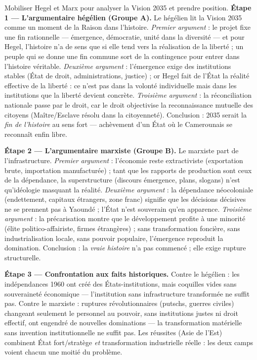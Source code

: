 \documentclass[11pt]{article}
\newcommand{\cle}[1]{{\popxbold\color{popdark}#1}}
\begin{document}
\begin{exoresolu}
Mobiliser Hegel et Marx pour analyser la Vision 2035 et prendre position.
\tcblower
\textbf{Étape 1 — L'argumentaire hégélien (Groupe A).} Le hégélien lit la Vision 2035 comme un moment de la Raison dans l'histoire. \emph{Premier argument} : le projet fixe une \cle{fin rationnelle} — émergence, démocratie, unité dans la diversité — et pour Hegel, l'histoire n'a de sens que si elle tend vers la réalisation de la liberté ; un peuple qui se donne une fin commune sort de la contingence pour entrer dans l'histoire véritable. \emph{Deuxième argument} : l'émergence exige des \cle{institutions stables} (État de droit, administrations, justice) ; or Hegel fait de l'État la réalité effective de la liberté : ce n'est pas dans la volonté individuelle mais dans les institutions que la liberté devient concrète. \emph{Troisième argument} : la \cle{réconciliation nationale} passe par le droit, car le droit objectivise la reconnaissance mutuelle des citoyens (Maître/Esclave résolu dans la citoyenneté). Conclusion : 2035 serait la \emph{fin de l'histoire} au sens fort — achèvement d'un État où le Camerounais se reconnaît enfin libre.

\textbf{Étape 2 — L'argumentaire marxiste (Groupe B).} Le marxiste part de l'\cle{infrastructure}. \emph{Premier argument} : l'économie reste \cle{extractiviste} (exportation brute, importation manufacturée) ; tant que les rapports de production sont ceux de la dépendance, la superstructure (discours émergence, plans, slogans) n'est qu'\cle{idéologie} masquant la réalité. \emph{Deuxième argument} : la \cle{dépendance néocoloniale} (endettement, capitaux étrangers, zone franc) signifie que les décisions décisives ne se prennent pas à Yaoundé ; l'État n'est souverain qu'en apparence. \emph{Troisième argument} : la \cle{précarisation} montre que le développement profite à une minorité (élite politico-affairiste, firmes étrangères) ; sans transformation foncière, sans industrialisation locale, sans pouvoir populaire, l'émergence reproduit la domination. Conclusion : la \emph{vraie histoire} n'a pas commencé ; elle exige rupture structurelle.

\textbf{Étape 3 — Confrontation aux faits historiques.} Contre le hégélien : les indépendances 1960 ont créé des États-institutions, mais coquilles vides sans souveraineté économique — l'institution sans infrastructure transformée ne suffit pas. Contre le marxiste : ruptures révolutionnaires (putschs, guerres civiles) changeant seulement le personnel au pouvoir, sans institutions justes ni droit effectif, ont engendré de nouvelles dominations — la transformation matérielle sans invention institutionnelle ne suffit pas. Les réussites (Asie de l'Est) combinent État fort/stratège \emph{et} transformation industrielle réelle : les deux camps voient chacun une moitié du problème.


\end{exoresolu}
\end{document}
